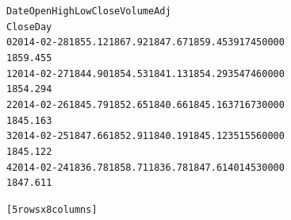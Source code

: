 \documentclass[letterpaper,10pt,english]{/Users/edwsurewin/anaconda/lib/python2.7/site-packages/sphinx/texinputs/sphinxhowto}
\newenvironment{InvisibleVerbatim}
        {\begin{mdframed}[leftmargin=0.1\linewidth,innerleftmargin=3pt,innerrightmargin=3pt, userdefinedwidth=1\linewidth, linewidth=0pt, linecolor=white, usetwoside=false]}
        {\end{mdframed}}
\begin{document}
    

        
        

            
                \begin{InvisibleVerbatim}
                \vspace{-0.5\baselineskip}
\begin{alltt}         Date     Open     High      Low    Close      Volume  Adj
Close Day
0  2014-02-28  1855.12  1867.92  1847.67  1859.45  3917450000
1859.45   5
1  2014-02-27  1844.90  1854.53  1841.13  1854.29  3547460000
1854.29   4
2  2014-02-26  1845.79  1852.65  1840.66  1845.16  3716730000
1845.16   3
3  2014-02-25  1847.66  1852.91  1840.19  1845.12  3515560000
1845.12   2
4  2014-02-24  1836.78  1858.71  1836.78  1847.61  4014530000
1847.61   1

[5 rows x 8 columns]
\end{alltt}

            \end{InvisibleVerbatim}
            
        
    


\end{document}

